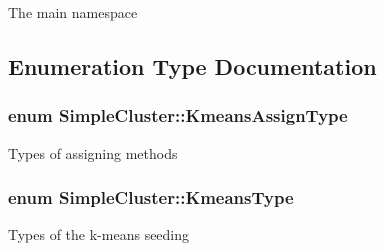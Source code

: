 The main namespace 

\subsection{Enumeration Type Documentation}
\hypertarget{namespaceSimpleCluster_a1ad2d6129171ff9a5ee57f48b5f3f6e1}{
\subsubsection[{Kmeans\-Assign\-Type}]{\setlength{\rightskip}{0pt plus 5cm}enum {\bf Simple\-Cluster\-::\-Kmeans\-Assign\-Type}\hspace{0.3cm}{\ttfamily [strong]}}}\label{namespaceSimpleCluster_a1ad2d6129171ff9a5ee57f48b5f3f6e1}
Types of assigning methods \hypertarget{namespaceSimpleCluster_a8a8f57121b69a7b43575e4d6a53928e2}{
\subsubsection[{Kmeans\-Type}]{\setlength{\rightskip}{0pt plus 5cm}enum {\bf Simple\-Cluster\-::\-Kmeans\-Type}\hspace{0.3cm}{\ttfamily [strong]}}}\label{namespaceSimpleCluster_a8a8f57121b69a7b43575e4d6a53928e2}
Types of the k-\/means seeding 

